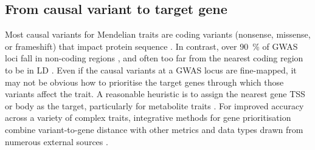 \begin{outline}
%
%
%
%

\subsection{From causal variant to target gene}

Most causal variants for Mendelian traits are coding variants (nonsense, missense, or frameshift) that impact protein sequence \autocite{chong2015GeneticBasisMendelian}.
In contrast, over \SI{90}{\percent} of \gls{GWAS} loci fall in non-coding regions \autocite{gallagher2018PostGWASEraAssociation},
and often too far from the nearest coding region to be in \gls{LD} \autocite{brodie2016HowFarSNP}.
Even if the causal variants at a \gls{GWAS} locus are fine-mapped, 
it may not be obvious how to prioritise the target genes through which those variants affect the trait.
A reasonable heuristic is to assign the nearest gene \gls{TSS} or body as the target, particularly for metabolite traits \autocite{stacey2019ProGeMFrameworkPrioritization}.
For improved accuracy across a variety of complex traits,
integrative methods for gene prioritisation combine variant-to-gene distance with other metrics and data types drawn from numerous external sources \autocite{stacey2019ProGeMFrameworkPrioritization,forgetta2020EffectorIndexPredict,ghoussaini2020OpenTargetsGenetics}.


\end{outline}
